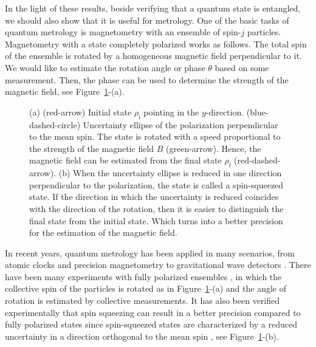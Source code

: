 In the light of these results, beside verifying that a quantum state is entangled, we should also show that it is useful for metrology.
One of the basic tasks of quantum metrology is magnetometry with an ensemble of spin-$j$ particles.
Magnetometry with a state completely polarized works as follows.
The total spin of the ensemble is rotated by a homogeneous magnetic field perpendicular to it.
We would like to estimate the rotation angle or phase $\theta$ based on some measurement.
Then, the phase can be used to determine the strength of the magnetic field,
see Figure~\ref{fig:int-magnetometry-totally-polarized}-(a).
\begin{figure}[htp]
  \centering
  \caption[Magnetometry with polarized states]{
  (a) (red-arrow) Initial state $\rho_{\text{i}}$ pointing in the $y$-direction.
  (blue-dashed-circle) Uncertainty ellipse of the polarization perpendicular to the mean spin.
  The state is rotated with a speed proportional to the strength of the magnetic field $B$ (green-arrow).
  Hence, the magnetic field can be estimated from the final state $\rho_{\text{f}}$ (red-dashed-arrow).
  (b) When the uncertainty ellipse is reduced in one direction perpendicular to the polarization, the state is called a spin-squeezed state.
  If the direction in which the uncertainty is reduced coincides with the direction of the rotation, then it is easier to distinguish the final state from the initial state.
  Which turns into a better precision for the estimation of the magnetic field.}
  \label{fig:int-magnetometry-totally-polarized}
\end{figure}

In recent years, quantum metrology has been applied in many scenarios, from atomic clocks \cite{Louchet-Chauvet2010, Borregaard2013, Kessler2014a} and precision magnetometry \cite{Wasilewski2010, Eckert2006, Wildermuth2006, Wolfgramm2010, Koschorreck2011, Vengalattore2007, Zhou2010} to gravitational wave detectors \cite{Schnabel2010, TheLIGOScientificCollaboration2011, Demkowicz-Dobrzanski2013}.
There have been many experiments with fully polarized ensembles \cite{Gross2012, Wasilewski2010, Wildermuth2006, Vengalattore2007, Behbood2013, Koschorreck2011, Muessel2014}, in which the collective spin of the particles is rotated as in Figure~\ref{fig:int-magnetometry-totally-polarized}-(a) and the angle of rotation is estimated by collective measurements.
It has also been verified experimentally that spin squeezing can result in a better precision compared to fully polarized states \cite{Riedel2010, Gross2012, Wasilewski2010, Muessel2014, Fernholz2008, Hald1999, Julsgaard2001, Hammerer2010, Esteve2008} since spin-squeezed states are characterized by a reduced uncertainty in a direction orthogonal to the mean spin \cite{Kitagawa1993, Wineland1994, Sorensen2001, Ma2011}, see Figure~\ref{fig:int-magnetometry-totally-polarized}-(b).

